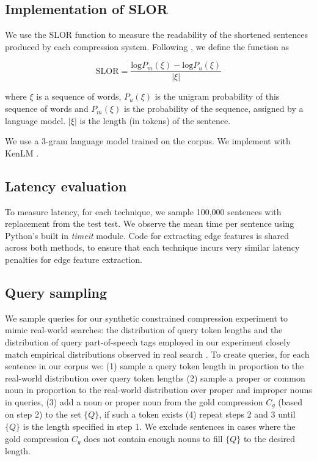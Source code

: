 \subsection{Implementation of SLOR}

We use the SLOR function to measure the readability of the shortened sentences produced by each compression system. Following \cite{lau2015unsupervised}, we define the function as 

\begin{equation}
\text{SLOR}=\frac{\text{log}P_m(\xi) - \text{log}P_u(\xi)}{|\xi|}
\end{equation}

where $\xi$ is a sequence of words, $P_u(\xi)$ is the unigram probability of this sequence of words and $P_m(\xi)$ is the probability of the sequence, assigned by a language model.  $|\xi|$ is the length (in tokens) of the sentence.

We use a 3-gram language model trained on the \citet{filippova2013overcoming} corpus. We implement with KenLM \cite{Heafield-kenlm}.

\subsection{Latency evaluation}
To measure latency, for each technique, we sample 100,000 sentences with replacement from the test test. We observe the mean time per sentence using Python's built in \textit{timeit} module. Code for extracting edge features is shared across both methods, to ensure that each technique incurs very similar latency penalties for edge feature extraction. 

\subsection{Query sampling}
We sample queries for our synthetic constrained compression experiment to mimic real-world searches: the distribution of query token lengths and the distribution of query part-of-speech tags employed in our experiment closely match empirical distributions observed in real search \cite{Jansen2000RealLR,Barr2008TheLS}. To create queries, for each sentence in our corpus we: (1) sample a query token length in proportion to the real-world distribution over query token lengths (2) sample a proper or common noun in proportion to the real-world distribution over proper and improper nouns in queries, (3) add a noun or proper noun from the gold compression $C_g$ (based on step 2) to the set $\{Q\}$, if such a token exists (4) repeat steps 2 and 3 until $\{Q\}$ is the length specified in step 1. We exclude sentences in cases where the gold compression $C_g$ does not contain enough nouns to fill $\{Q\}$ to the desired length.



